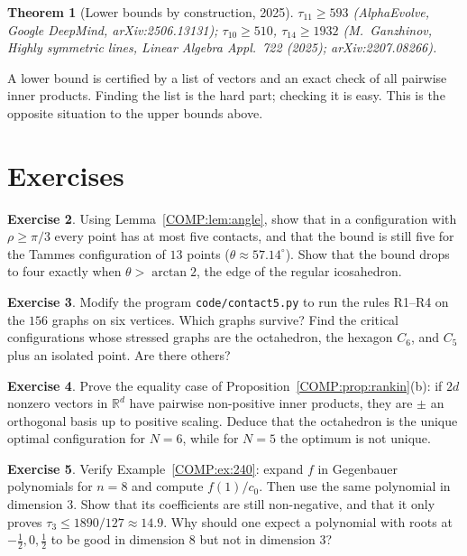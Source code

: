\documentclass[11pt,openany]{book}
\theoremstyle{plain}
\newtheorem{theorem}{Theorem}[chapter]
\theoremstyle{definition}
\newtheorem{exercise}[theorem]{Exercise}
\theoremstyle{remark}
\newcommand{\R}{\mathbb{R}}
\newcommand{\kiss}{\tau}               %
\begin{document}
\begin{theorem}[Lower bounds by construction, 2025]
$\kiss_{11}\ge593$ (AlphaEvolve, Google DeepMind, arXiv:2506.13131); $\kiss_{10}\ge510$, $\kiss_{14}\ge1932$
(M.~Ganzhinov, \emph{Highly symmetric lines}, Linear Algebra Appl.\ 722 (2025); arXiv:2207.08266).
\end{theorem}
\noindent A lower bound is certified by a list of vectors and an exact check of all pairwise inner products.
Finding the list is the hard part; checking it is easy. This is the opposite situation to the upper bounds above.

\section*{Exercises}

\begin{exercise}
Using Lemma~\ref{COMP:lem:angle}, show that in a configuration with $\rho\ge\pi/3$ every point has at most five
contacts, and that the bound is still five for the Tammes configuration of $13$ points
($\theta\approx57.14^\circ$). Show that the bound drops to four exactly when $\theta>\arctan2$, the edge of the
regular icosahedron.
\end{exercise}

\begin{exercise}
Modify the program \texttt{code/contact5.py} to run the rules R1--R4 on the $156$ graphs on six vertices.
Which graphs survive?
Find the critical configurations whose stressed graphs are the octahedron, the hexagon $C_6$, and $C_5$ plus an
isolated point. Are there others?
\end{exercise}

\begin{exercise}
Prove the equality case of Proposition~\ref{COMP:prop:rankin}(b): if $2d$ nonzero vectors in $\R^d$ have pairwise
non-positive inner products, they are $\pm$ an orthogonal basis up to positive scaling. Deduce that the octahedron
is the unique optimal configuration for $N=6$, while for $N=5$ the optimum is not unique.
\end{exercise}

\begin{exercise}
Verify Example~\ref{COMP:ex:240}: expand $f$ in Gegenbauer polynomials for $n=8$ and compute $f(1)/c_0$. Then
use the same polynomial in dimension $3$. Show that its coefficients are still non-negative, and that it only
proves $\kiss_3\le1890/127\approx14.9$. Why should one expect a polynomial with roots at $-\frac12,0,\frac12$ to
be good in dimension $8$ but not in dimension $3$?
\end{exercise}
\end{document}
